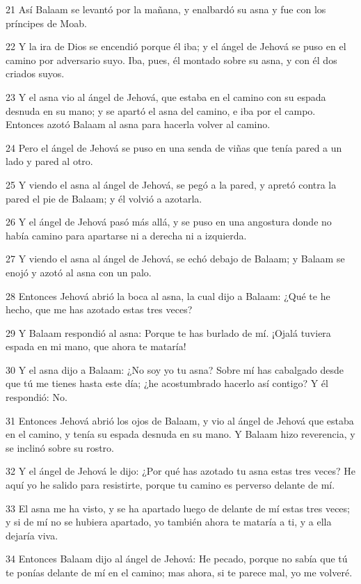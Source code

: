 \par 21 Así Balaam se levantó por la mañana, y enalbardó su asna y fue con los príncipes de Moab.
\par 22 Y la ira de Dios se encendió porque él iba; y el ángel de Jehová se puso en el camino por adversario suyo. Iba, pues, él montado sobre su asna, y con él dos criados suyos.
\par 23 Y el asna vio al ángel de Jehová, que estaba en el camino con su espada desnuda en su mano; y se apartó el asna del camino, e iba por el campo. Entonces azotó Balaam al asna para hacerla volver al camino.
\par 24 Pero el ángel de Jehová se puso en una senda de viñas que tenía pared a un lado y pared al otro.
\par 25 Y viendo el asna al ángel de Jehová, se pegó a la pared, y apretó contra la pared el pie de Balaam; y él volvió a azotarla.
\par 26 Y el ángel de Jehová pasó más allá, y se puso en una angostura donde no había camino para apartarse ni a derecha ni a izquierda.
\par 27 Y viendo el asna al ángel de Jehová, se echó debajo de Balaam; y Balaam se enojó y azotó al asna con un palo.
\par 28 Entonces Jehová abrió la boca al asna, la cual dijo a Balaam: ¿Qué te he hecho, que me has azotado estas tres veces?
\par 29 Y Balaam respondió al asna: Porque te has burlado de mí. ¡Ojalá tuviera espada en mi mano, que ahora te mataría!
\par 30 Y el asna dijo a Balaam: ¿No soy yo tu asna? Sobre mí has cabalgado desde que tú me tienes hasta este día; ¿he acostumbrado hacerlo así contigo? Y él respondió: No.
\par 31 Entonces Jehová abrió los ojos de Balaam, y vio al ángel de Jehová que estaba en el camino, y tenía su espada desnuda en su mano. Y Balaam hizo reverencia, y se inclinó sobre su rostro.
\par 32 Y el ángel de Jehová le dijo: ¿Por qué has azotado tu asna estas tres veces? He aquí yo he salido para resistirte, porque tu camino es perverso delante de mí.
\par 33 El asna me ha visto, y se ha apartado luego de delante de mí estas tres veces; y si de mí no se hubiera apartado, yo también ahora te mataría a ti, y a ella dejaría viva.
\par 34 Entonces Balaam dijo al ángel de Jehová: He pecado, porque no sabía que tú te ponías delante de mí en el camino; mas ahora, si te parece mal, yo me volveré.
